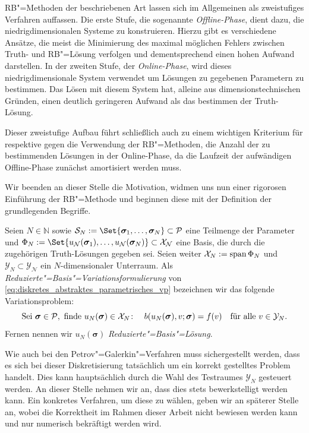 \documentclass[../main.tex]{subfiles}
\begin{document}
RB"=Methoden der beschriebenen Art lassen sich im Allgemeinen als zweistufiges Verfahren auffassen.
Die erste Stufe, die sogenannte \emph{Offline-Phase}, dient dazu, die niedrigdimensionalen Systeme zu konstruieren.
Hierzu gibt es verschiedene Ansätze, die meist die Minimierung des maximal möglichen Fehlers zwischen Truth- und RB"=Lösung verfolgen und dementsprechend einen hohen Aufwand darstellen.
In der zweiten Stufe, der \emph{Online-Phase}, wird dieses niedrigdimensionale System verwendet um Lösungen zu gegebenen Parametern zu bestimmen.
Das Lösen mit diesem System hat, alleine aus dimensionstechnischen Gründen, einen deutlich geringeren Aufwand als das bestimmen der Truth-Lösung.

Dieser zweistufige Aufbau führt schließlich auch zu einem wichtigen Kriterium für respektive gegen die Verwendung der RB"=Methoden, die Anzahl der zu bestimmenden Lösungen in der Online-Phase, da die Laufzeit der aufwändigen Offline-Phase zunächst amortisiert werden muss.

Wir beenden an dieser Stelle die Motivation, widmen uns nun einer rigorosen Einführung der RB"=Methode und beginnen diese mit der Definition der grundlegenden Begriffe.

\begin{Definition}
\label{definition:rb_variationsproblem}
    Seien $N \in \mathbb{N}$ sowie $\mathcal S_{N} := \Set{ \bm \sigma_{1}, \dots, \bm \sigma_{N} } \subset \mathcal P$ eine Teilmenge der Parameter und $\Phi_{N} := \Set{ u_{\mathcal N}(\bm \sigma_{1}), \dots, u_{\mathcal N}(\bm \sigma_{N})} \subset \mathcal X_{\mathcal N}$ eine Basis, die durch die zugehörigen Truth-Lösungen gegeben sei.
    Seien weiter $\mathcal X_{N} := \operatorname{span} \Phi_{N}$ und $\mathcal Y_{N} \subset \mathcal Y_{\mathcal N}$ ein $N$-dimensionaler Unterraum.
    Als \emph{Reduzierte"=Basis"=Variationsformulierung} von \cref{eq:diskretes_abstraktes_parametrisches_vp} bezeichnen wir das folgende Variationsproblem:
    \begin{equation}
    \label{eq:rb_abstraktes_parametriches_vp}
        \text{Sei } \bm \sigma \in \mathcal P, \text{ finde } u_{N}(\bm \sigma) \in \mathcal X_{N} \colon \quad b(u_{N}(\bm \sigma), v; \bm \sigma) = f(v) \quad \fa v \in \mathcal Y_{N}.
    \end{equation}
    Fernen nennen wir $u_{N}(\bm \sigma)$ \emph{Reduzierte"=Basis"=Lösung}.
\end{Definition}

Wie auch bei den Petrov"=Galerkin"=Verfahren muss sichergestellt werden, dass es sich bei dieser Diskretisierung tatsächlich um ein korrekt gestelltes Problem handelt.
Dies kann hauptsächlich durch die Wahl des Testraumes $\mathcal Y_{N}$ gesteuert werden.
An dieser Stelle nehmen wir an, dass dies stets bewerkstelligt werden kann.
Ein konkretes Verfahren, um diese zu wählen, geben wir an späterer Stelle an, wobei die Korrektheit im Rahmen dieser Arbeit nicht bewiesen werden kann und nur numerisch bekräftigt werden wird.
\end{document}
